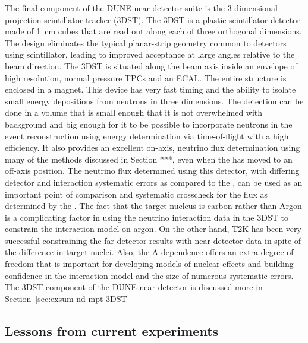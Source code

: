 The final component of the DUNE near detector suite is the 3-dimensional projection scintillator tracker (3DST).  The 3DST is a plastic scintillator detector made of 1~cm cubes that are read out along each of three orthogonal dimensions.  The design eliminates the typical planar-strip geometry common to detectors using scintillator, leading to improved acceptance at large angles relative to the beam direction.  The 3DST is situated along the beam axis inside an envelope of high resolution, normal pressure TPCs and an ECAL.  The entire structure is enclosed in a magnet.  This device has very fast timing and the ability to isolate small energy depositions from neutrons in three dimensions.  The detection can be done in a volume that is small enough that it is not overwhelmed with background and big enough for it to be possible to incorporate neutrons in the event reconstruction using energy determination via time-of-flight with a high efficiency.  It also provides an excellent on-axis, neutrino flux determination using many of the methods discussed in Section ***, even when the  has moved to an off-axis position.  The neutrino flux determined using this detector, with  differing detector and interaction systematic errors as compared to the , can be used as an important point of comparison and systematic crosscheck for the flux as determined by the .  The fact that the target nucleus is carbon rather than Argon is a complicating factor in using the neutrino interaction data in the 3DST to constrain the interaction model on argon.  On the other hand, T2K has been very successful constraining the far detector results with near detector data in spite of the difference in target nuclei.  Also, the A dependence offers an extra degree of freedom that is important for developing models of nuclear effects and building confidence in the interaction model and the size of numerous systematic errors.  The 3DST component of the DUNE near detector is discussed more in Section~\ref{sec:exsum-nd-mpt-3DST}


\subsection{Lessons from current experiments}
\label{ssec:exsum-nd-overview-lessons}

